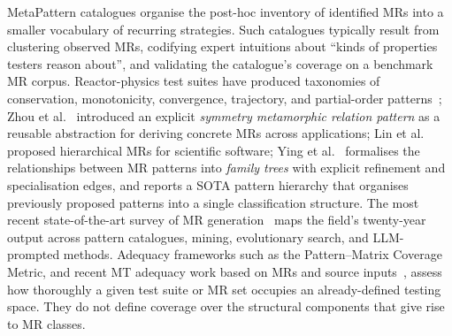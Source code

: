 \documentclass[acmsmall,screen,review]{acmart}
\begin{document}
MetaPattern catalogues organise the post-hoc inventory of identified MRs into a smaller vocabulary of recurring strategies. Such catalogues typically result from clustering observed MRs, codifying expert intuitions about ``kinds of properties testers reason about'', and validating the catalogue's coverage on a benchmark MR corpus. Reactor-physics test suites have produced taxonomies of conservation, monotonicity, convergence, trajectory, and partial-order patterns~\cite{BellGlasstone1970, LewisMiller1993}; Zhou et al.~\cite{Zhou2020SymmetryMRP} introduced an explicit \emph{symmetry metamorphic relation pattern} as a reusable abstraction for deriving concrete MRs across applications; Lin et al.~\cite{Lin2018HierarchicalMR} proposed hierarchical MRs for scientific software; Ying et al.~\cite{Ying2025MRPatterns} formalises the relationships between MR patterns into \emph{family trees} with explicit refinement and specialisation edges, and reports a SOTA pattern hierarchy that organises previously proposed patterns into a single classification structure. The most recent state-of-the-art survey of MR generation~\cite{LiTOSEM2025} maps the field's twenty-year output across pattern catalogues, mining, evolutionary search, and LLM-prompted methods. Adequacy frameworks such as the Pattern--Matrix Coverage Metric, and recent MT adequacy work based on MRs and source inputs~\cite{Fu2024MTAdequacy}, assess how thoroughly a given test suite or MR set occupies an already-defined testing space. They do not define coverage over the structural components that give rise to MR classes.
\end{document}
